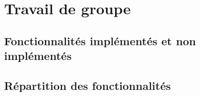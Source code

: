 \chapter{Travail de groupe}



	\section{Fonctionnalités implémentés et non implémentés}



	\section{Répartition des fonctionnalités}

